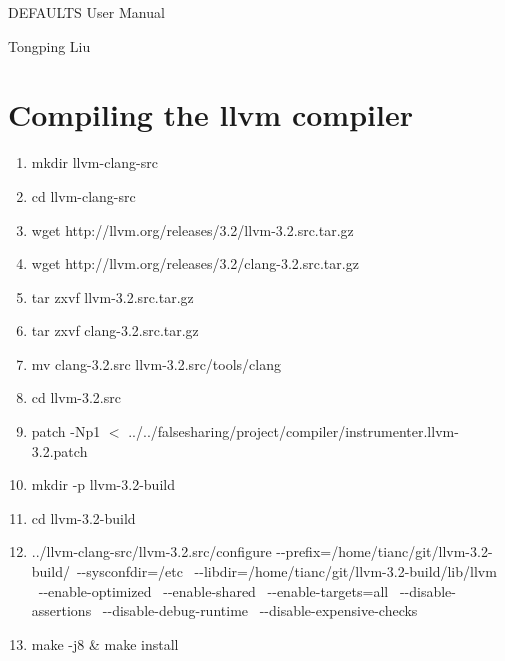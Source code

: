 \documentclass[10pt]{article}
\begin{document}
  \centerline{DEFAULTS User Manual}
  \centerline{\small \sc Tongping Liu}

  \setlength{\parindent}{1.5em}
  \vspace{0.7cm}

\section*{}

\section{Compiling the llvm compiler}
\begin{enumerate}
\item
mkdir llvm-clang-src

\item
cd llvm-clang-src

\item
wget http://llvm.org/releases/3.2/llvm-3.2.src.tar.gz

\item
wget http://llvm.org/releases/3.2/clang-3.2.src.tar.gz

\item
tar zxvf llvm-3.2.src.tar.gz 

\item
tar zxvf clang-3.2.src.tar.gz 

\item
mv clang-3.2.src llvm-3.2.src/tools/clang

\item
cd llvm-3.2.src

\item
patch -Np1 $<$ ../../falsesharing/project/compiler/instrumenter.llvm-3.2.patch 


\item
mkdir -p llvm-3.2-build

\item
cd llvm-3.2-build

\item
../llvm-clang-src/llvm-3.2.src/configure -{}-prefix=/home/tianc/git/llvm-3.2-build/\
            -{}-sysconfdir=/etc          \
            -{}-libdir=/home/tianc/git/llvm-3.2-build/lib/llvm     \
            -{}-enable-optimized         \
            -{}-enable-shared            \
            -{}-enable-targets=all       \
            -{}-disable-assertions       \
            -{}-disable-debug-runtime    \
            -{}-disable-expensive-checks 
\item
make -j8 \& make install

\end{enumerate}
\end{document}

